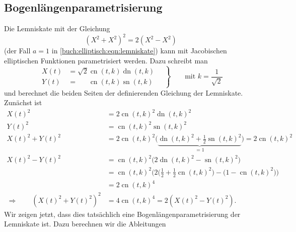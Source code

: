 \subsection{Bogenlängenparametrisierung}
Die Lemniskate mit der Gleichung
\[
(X^2+X^2)^2=2(X^2-X^2)
\]
(der Fall $a=1$ in \eqref{buch:elliptisch:eqn:lemniskate})
kann mit Jacobischen elliptischen Funktionen
parametrisiert werden.
Dazu schreibt man
\[
\left.
\begin{aligned}
X(t)
&=
\sqrt{2}\operatorname{cn}(t,k) \operatorname{dn}(t,k)
\\
Y(t)
&=
\phantom{\sqrt{2}}
\operatorname{cn}(t,k) \operatorname{sn}(t,k)
\end{aligned}
\quad\right\}
\qquad\text{mit $k=\displaystyle\frac{1}{\sqrt{2}}$}
\]
und berechnet die beiden Seiten der definierenden Gleichung der
Lemniskate.
Zunächst ist
\begin{align*}
X(t)^2
&=
2\operatorname{cn}(t,k)^2
\operatorname{dn}(t,k)^2
\\
Y(t)^2
&=
\operatorname{cn}(t,k)^2
\operatorname{sn}(t,k)^2
\\
X(t)^2+Y(t)^2
&=
2\operatorname{cn}(t,k)^2
\bigl(
\underbrace{
\operatorname{dn}(t,k)^2
+{\textstyle\frac12}
\operatorname{sn}(t,k)^2
}_{\displaystyle =1}
\bigr)
=
2\operatorname{cn}(t,k)^2
\\
X(t)^2-Y(t)^2
&=
\operatorname{cn}(t,k)^2
\bigl(
2\operatorname{dn}(t,k)^2 - \operatorname{sn}(t,k)^2
\bigr)
\\
&=
\operatorname{cn}(t,k)^2
\bigl(
2\bigl({\textstyle\frac12}+{\textstyle\frac12}\operatorname{cn}(t,k)^2\bigr)
-
\bigl(1-\operatorname{cn}(t,k)^2\bigr)
\bigr)
\\
&=
2\operatorname{cn}(t,k)^4
\\
\Rightarrow\qquad
(X(t)^2+Y(t)^2)^2
&=
4\operatorname{cn}(t,k)^4
=
2(X(t)^2-Y(t)^2).
\end{align*}
Wir zeigen jetzt, dass dies tatsächlich eine Bogenlängenparametrisierung
der Lemniskate ist.
Dazu berechnen wir die Ableitungen

